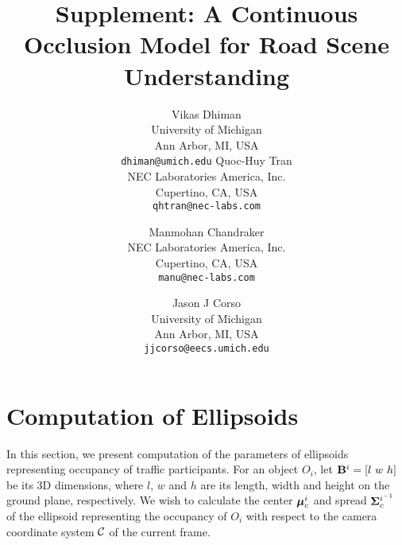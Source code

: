 \documentclass[10pt,twocolumn,letterpaper]{article}
\begin{document}
\title{Supplement: A Continuous Occlusion Model for Road Scene Understanding}

\author{Vikas Dhiman\\
  University of Michigan\\
  Ann Arbor, MI, USA\\
{\tt\small dhiman@umich.edu}
Quoc-Huy Tran\\
NEC Laboratories America, Inc.\\
Cupertino, CA, USA\\
{\tt\small qhtran@nec-labs.com}
\and
Manmohan Chandraker\\
NEC Laboratories America, Inc.\\
Cupertino, CA, USA\\
{\tt\small manu@nec-labs.com}
\and
Jason J Corso\\
  University of Michigan\\
  Ann Arbor, MI, USA\\
{\tt\small jjcorso@eecs.umich.edu}
}

\maketitle

\appendix 

\section{Computation of Ellipsoids}
\label{sec:sigmacomputation}
In this section, we present computation of the parameters of ellipsoids representing occupancy of traffic participants. For an object $O_i$, let $\mathbf{B}^i = [l~w~h]$ be its 3D dimensions, where $l$, $w$ and $h$ are its length, width and height on the ground plane, respectively. We wish to calculate the center ${{\bm{\mu}}^{i}_c}$ and spread $\bm{\Sigma}^{i^{-1}}_c$ of the ellipsoid representing the occupancy of $O_i$ with respect to the camera coordinate system ${\mathcal{C}}$ of the current frame. 
\end{document}
